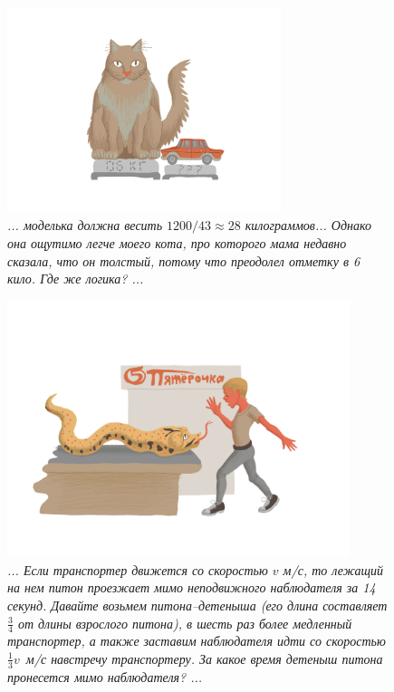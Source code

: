 \documentclass[10pt]{scrbook} \usepackage{modules/nonstahp_book}
\begin{document}
\begin{figure} \begin{center}
	\includegraphics[width=8cm]{figures/color/03}
	\caption{
             {\itshape ... моделька должна весить $1200 / 43 \approx 28$ килограммов... 
             Однако она ощутимо легче моего кота, про которого мама недавно сказала, 
             что он толстый, потому что преодолел отметку в 6 кило. Где же логика? ...}\\
             }
\end{center} \end{figure}

\begin{figure} \begin{center}
	\includegraphics[width=10cm]{figures/color/04}
	\caption{
             {\itshape ... Если транспортер движется со скоростью $v$ м/с, то лежащий 
             на нем питон проезжает мимо неподвижного наблюдателя за 14 секунд. 
             Давайте возьмем питона–детеныша (его длина составляет $\tfrac{3}{4}$ от 
             длины взрослого питона), в шесть раз более медленный транспортер, а также 
             заставим наблюдателя идти со скоростью $\tfrac{1}{3}v$~м/с навстречу транспортеру. 
             За какое время детеныш питона пронесется мимо наблюдателя? ...}\\
             }
\end{center} \end{figure}
\end{document}
